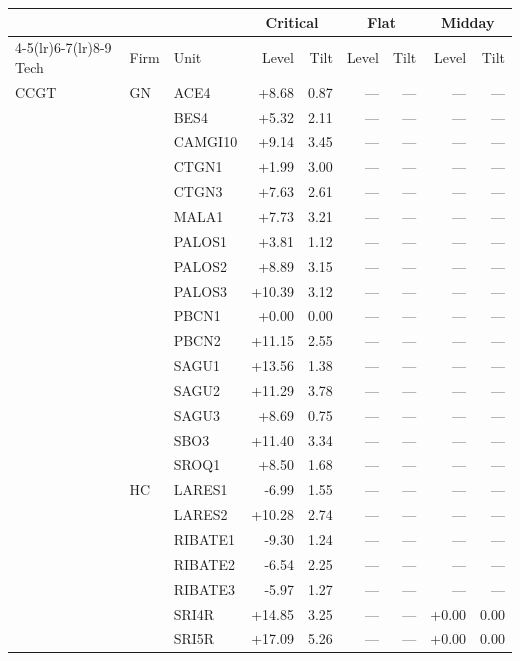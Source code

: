 \begin{tabular}{l l l r r r r r r}
\toprule
 & & & \multicolumn{2}{c}{Critical} & \multicolumn{2}{c}{Flat} & \multicolumn{2}{c}{Midday} \\
\cmidrule(lr){4-5}\cmidrule(lr){6-7}\cmidrule(lr){8-9}
Tech & Firm & Unit & Level & Tilt & Level & Tilt & Level & Tilt \\
\midrule
CCGT & GN & ACE4 & +8.68 & 0.87 & --- & --- & --- & --- \\
 &  & BES4 & +5.32 & 2.11 & --- & --- & --- & --- \\
 &  & CAMGI10 & +9.14 & 3.45 & --- & --- & --- & --- \\
 &  & CTGN1 & +1.99 & 3.00 & --- & --- & --- & --- \\
 &  & CTGN3 & +7.63 & 2.61 & --- & --- & --- & --- \\
 &  & MALA1 & +7.73 & 3.21 & --- & --- & --- & --- \\
 &  & PALOS1 & +3.81 & 1.12 & --- & --- & --- & --- \\
 &  & PALOS2 & +8.89 & 3.15 & --- & --- & --- & --- \\
 &  & PALOS3 & +10.39 & 3.12 & --- & --- & --- & --- \\
 &  & PBCN1 & +0.00 & 0.00 & --- & --- & --- & --- \\
 &  & PBCN2 & +11.15 & 2.55 & --- & --- & --- & --- \\
 &  & SAGU1 & +13.56 & 1.38 & --- & --- & --- & --- \\
 &  & SAGU2 & +11.29 & 3.78 & --- & --- & --- & --- \\
 &  & SAGU3 & +8.69 & 0.75 & --- & --- & --- & --- \\
 &  & SBO3 & +11.40 & 3.34 & --- & --- & --- & --- \\
 &  & SROQ1 & +8.50 & 1.68 & --- & --- & --- & --- \\
 & HC & LARES1 & -6.99 & 1.55 & --- & --- & --- & --- \\
 &  & LARES2 & +10.28 & 2.74 & --- & --- & --- & --- \\
 &  & RIBATE1 & -9.30 & 1.24 & --- & --- & --- & --- \\
 &  & RIBATE2 & -6.54 & 2.25 & --- & --- & --- & --- \\
 &  & RIBATE3 & -5.97 & 1.27 & --- & --- & --- & --- \\
 &  & SRI4R & +14.85 & 3.25 & --- & --- & +0.00 & 0.00 \\
 &  & SRI5R & +17.09 & 5.26 & --- & --- & +0.00 & 0.00 \\

\end{tabular}
